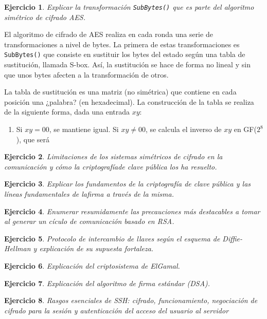 \documentclass[
  a4paper,
  spanish,
  12pt,
]{scrartcl}
\theoremstyle{ejercicio-style}
\newtheorem{ejer}{Ejercicio}
\theoremstyle{remark-style}
\begin{document}
\begin{ejer}
  Explicar la transformación \texttt{SubBytes()} que es parte del algoritmo simétrico de cifrado AES.
\end{ejer}

El algoritmo de cifrado de AES realiza en cada ronda una serie de transformaciones a nivel de bytes. La primera de estas transformaciones es \texttt{SubBytes()} que consiste en sustituir los bytes del estado según una tabla de sustitución, llamada S-box. Así, la sustitución se hace de forma no lineal y sin que unos bytes afecten a la transformación de otros.

La tabla de sustitución es una matriz (no simétrica) que contiene en cada posición una ¿palabra? (en hexadecimal). La construcción de la tabla se realiza de la siguiente forma, dada una entrada $xy$:

\begin{enumerate}
\item Si $xy = 00$, se mantiene igual. Si $xy \neq 00$, se calcula el inverso de $xy$ en GF($2^8$), que será 
\end{enumerate}

\begin{ejer}
  Limitaciones de los sistemas simétricos de cifrado en la comunicación y cómo la criptografíade clave pública los ha resuelto.
\end{ejer}

\begin{ejer}
  Explicar los fundamentos de la criptografía de clave pública y las líneas fundamentales de lafirma a través de la misma.
\end{ejer}

\begin{ejer}
  Enumerar resumidamente las precauciones más destacables a tomar al generar un cículo de comunicación basado en RSA.
\end{ejer}

\begin{ejer}
  Protocolo de intercambio de llaves según el esquema de Diffie-Hellman y explicación de su supuesta fortaleza.
\end{ejer}

\begin{ejer}
  Explicación del criptosistema de ElGamal.
\end{ejer}

\begin{ejer}
  Explicación del algoritmo de firma estándar (DSA).
\end{ejer}

\begin{ejer}
  Rasgos esenciales de SSH: cifrado, funcionamiento, negociación de cifrado para la sesión y autenticación del acceso del usuario al servidor
\end{ejer}
\end{document}
